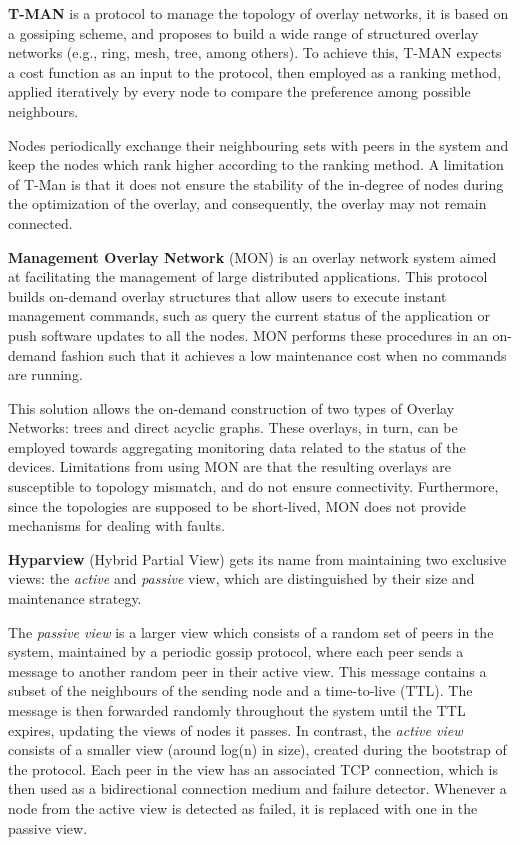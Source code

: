 \textbf{T-MAN} \cite{t-man} is a protocol to manage the topology of overlay networks, it is based on a gossiping scheme, and proposes to build a wide range of structured overlay networks (e.g., ring, mesh, tree, among others). To achieve this, T-MAN expects a cost function as an input to the protocol, then employed as a ranking method, applied iteratively by every node to compare the preference among possible neighbours. 

Nodes periodically exchange their neighbouring sets with peers in the system and keep the nodes which rank higher according to the ranking method. A limitation of T-Man is that it does not ensure the stability of the in-degree of nodes during the optimization of the overlay, and consequently, the overlay may not remain connected. 

\textbf{Management Overlay Network} \cite{liang2005mon} (MON) is an overlay network system aimed at facilitating the management of large distributed applications. This protocol builds on-demand overlay structures that allow users to execute instant management commands, such as query the current status of the application or push software updates to all the nodes. MON performs these procedures in an on-demand fashion such that it achieves a low maintenance cost when no commands are running.

This solution allows the on-demand construction of two types of Overlay Networks: trees and direct acyclic graphs. These overlays, in turn, can be employed towards aggregating monitoring data related to the status of the devices. Limitations from using MON are that the resulting overlays are susceptible to topology mismatch, and do not ensure connectivity. Furthermore, since the topologies are supposed to be short-lived, MON does not provide mechanisms for dealing with faults.

\textbf{Hyparview} \cite{Hyparview} (Hybrid Partial View) gets its name from maintaining two exclusive views: the \textit{active} and \textit{passive} view, which are distinguished by their size and maintenance strategy. 

The \textit{passive view} is a larger view which consists of a random set of peers in the system,  maintained by a periodic gossip protocol, where each peer sends a message to another random peer in their active view. This message contains a subset of the neighbours of the sending node and a time-to-live (TTL). The message is then forwarded randomly throughout the system until the TTL expires, updating the views of nodes it passes. In contrast, the \textit{active view} consists of a smaller view (around log(n) in size), created during the bootstrap of the protocol. Each peer in the view has an associated TCP connection, which is then used as a bidirectional connection medium and failure detector. Whenever a node from the active view is detected as failed, it is replaced with one in the passive view.

